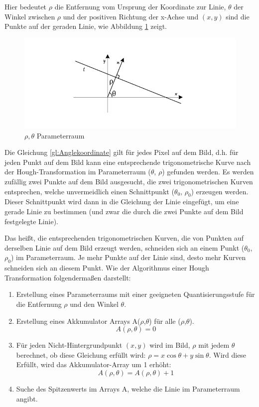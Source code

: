 Hier bedeutet $ \rho $ die Entfernung vom Ursprung der Koordinate zur Linie, $ \theta $ der Winkel zwischen $ \rho $ und der positiven Richtung der x-Achse und $ (x,y) $ sind die Punkte auf der geraden Linie, wie Abbildung \ref{fig:Hough} zeigt.

\begin{figure}[H]
 \centering 
  \includegraphics[keepaspectratio,width=1.0\textwidth]{images/4_ZweiteErfahrung/Hough/Hough.pdf}
 \caption{$ \rho,\theta $ Parameterraum}
 \label{fig:Hough}
\end{figure}

Die Gleichung \ref{gl:Anglekoordinate} gilt für jedes Pixel auf dem Bild, d.h. für jeden Punkt auf dem Bild kann eine entsprechende trigonometrische Kurve nach der Hough-Transformation im Parameterraum ($ \theta $, $ \rho $) gefunden werden. Es werden zufällig zwei Punkte auf dem Bild ausgesucht, die zwei trigonometrischen Kurven entsprechen, welche unvermeidlich einen Schnittpunkt ($ \theta_0 $, $ \rho_0 $) erzeugen werden. Dieser Schnittpunkt wird dann in die Gleichung der Linie eingefügt, um eine gerade Linie zu bestimmen (und zwar die durch die zwei Punkte auf dem Bild festgelegte Linie). 

Das heißt, die entsprechenden trigonometrischen Kurven, die von Punkten auf derselben Linie auf dem Bild erzeugt werden, schneiden sich an einem Punkt ($ \theta_0 $, $ \rho_0 $) im Parameterraum. Je mehr Punkte auf der Linie sind, desto mehr Kurven schneiden sich an diesem Punkt. Wie der Algorithmus einer Hough Transformation folgendermaßen darstellt:

\begin{enumerate}
\item Erstellung eines Parameterraums mit einer geeigneten Quantisierungsstufe für die Entfernung $ \rho $ und den Winkel $ \theta $.
\item Erstellung eines Akkumulator Arrays A($ \rho $,$ \theta $) für alle ($ \rho $,$ \theta $).
\begin{equation}
A(\rho,\theta) = 0
\end{equation}
\item Für jeden Nicht-Hintergrundpunkt $ (x,y) $ wird im Bild, $ \rho $ mit jedem $ \theta $ berechnet, ob diese Gleichung erfüllt wird: $ \rho = x \cos \theta + y \sin \theta $. Wird diese Erfüllt, wird das Akkumulator-Array um 1 erhöht: 
\begin{equation}
 A(\rho,\theta) = A(\rho,\theta) + 1 
\end{equation}
\item Suche des Spitzenwerts im Arrays A, welche die Linie im Parameterraum angibt.
\end{enumerate}

